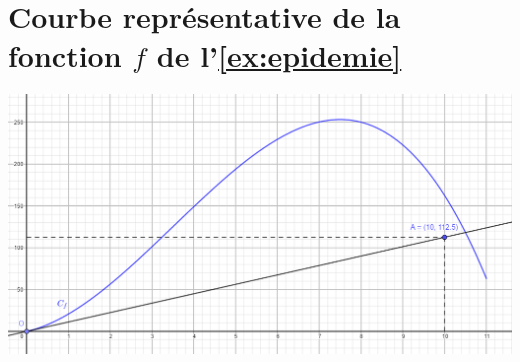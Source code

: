 \section{Courbe représentative de la fonction $f$ de l'\ref{ex:epidemie}}\label{app:fig}

		
		\includegraphics[angle=270, scale=0.7]{img/courbe_epidemie}
		
